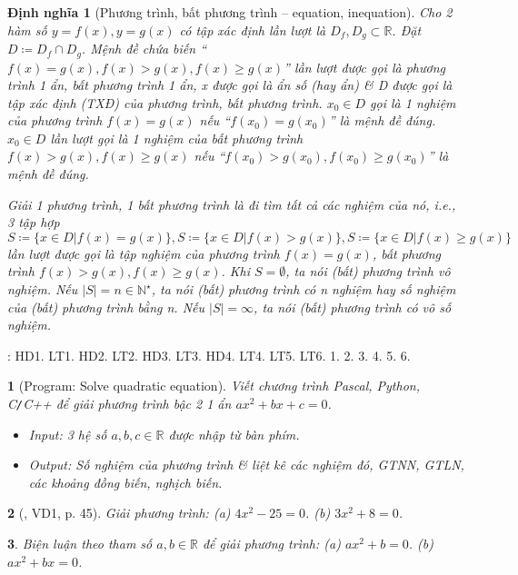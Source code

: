 \documentclass{article}
\newtheorem{baitoan}{}
\newtheorem{dinhnghia}{Định nghĩa}
\begin{document}
\begin{dinhnghia}[Phương trình, bất phương trình -- equation, inequation]
	Cho 2 hàm số $y = f(x),y = g(x)$ có tập xác định lần lượt là $D_f,D_g\subset\mathbb{R}$. Đặt $D\coloneqq D_f\cap D_g$. Mệnh đề chứa biến ``$f(x) = g(x),f(x) > g(x),f(x)\ge g(x)$'' lần lượt được gọi là {\rm phương trình 1 ẩn, bất phương trình 1 ẩn}, x được gọi là {\rm ẩn số} (hay {\rm ẩn}) \& D được gọi là {\rm tập xác định (TXĐ)} của phương trình, bất phương trình. $x_0\in D$ gọi là 1 {\rm nghiệm} của phương trình $f(x) = g(x)$ nếu ``$f(x_0) = g(x_0)$'' là mệnh đề đúng. $x_0\in D$ lần lượt gọi là 1 {\rm nghiệm} của bất phương trình $f(x) > g(x),f(x)\ge g(x)$ nếu ``$f(x_0) > g(x_0),f(x_0)\ge g(x_0)$'' là mệnh đề đúng.
	
	{\rm Giải} 1 phương trình, 1 bất phương trình là đi tìm tất cả các nghiệm của nó, i.e., 3 tập hợp $S\coloneqq\{x\in D|f(x) = g(x)\},S\coloneqq\{x\in D|f(x) > g(x)\},S\coloneqq\{x\in D|f(x)\ge g(x)\}$ lần lượt được gọi là {\rm tập nghiệm} của phương trình $f(x) = g(x)$, bất phương trình $f(x) > g(x),f(x)\ge g(x)$. Khi $S = \emptyset$, ta nói (bất) phương trình {\rm vô nghiệm}. Nếu $|S| = n\in\mathbb{N}^\star$, ta nói (bất) phương trình có n nghiệm hay số nghiệm của (bất) phương trình bằng n. Nếu $|S| = \infty$, ta nói (bất) phương trình có vô số nghiệm.
\end{dinhnghia}
\noindent\cite[Chap. VII, \S2, pp. 52--60]{SGK_Toan_9_Canh_Dieu_tap_2}: HD1. LT1. HD2. LT2. HD3. LT3. HD4. LT4. LT5. LT6. 1. 2. 3. 4. 5. 6.

\begin{baitoan}[{\sf Program}: Solve quadratic equation]
	Viết chương trình {\sf Pascal, Python, C{\tt/}C++} để giải phương trình bậc 2 1 ẩn $ax^2 + bx + c = 0$.
	\begin{itemize}
		\item {\sf Input}: 3 hệ số $a,b,c\in\mathbb{R}$ được nhập từ bàn phím.
		\item {\sf Output}: Số nghiệm của phương trình \& liệt kê các nghiệm đó, {\rm GTNN, GTLN}, các khoảng đồng biến, nghịch biến.
	\end{itemize}
\end{baitoan}

\begin{baitoan}[\cite{Binh_boi_duong_Toan_9_tap_2}, VD1, p. 45]
	Giải phương trình: (a) $4x^2 - 25 = 0$. (b) $3x^2 + 8 = 0$.
\end{baitoan}

\begin{baitoan}
	Biện luận theo tham số $a,b\in\mathbb{R}$ để giải phương trình: (a) $ax^2 + b = 0$. (b) $ax^2 + bx = 0$.
\end{baitoan}
\end{document}
